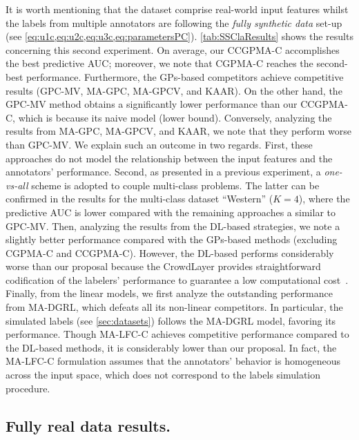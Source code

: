 \documentclass[journal]{IEEEtran}
\begin{document}
It is worth mentioning that the dataset comprise real-world input features whilst the labels from multiple annotators are following the \textit{fully synthetic data} set-up (see \cref{eq:u1c,eq:u2c,eq:u3c,eq:parametersPC}). \cref{tab:SSClaResults} shows the results concerning this second experiment. On average, our CCGPMA-C accomplishes the best predictive AUC; moreover, we note that CGPMA-C reaches the second-best performance. Furthermore, the GPs-based competitors achieve competitive results (GPC-MV, MA-GPC, MA-GPCV, and KAAR). On the other hand, the GPC-MV method obtains a significantly lower performance than our CCGPMA-C, which is because its naive model (lower bound). Conversely, analyzing the results from MA-GPC, MA-GPCV, and KAAR, we note that they perform worse than GPC-MV. We explain such an outcome in two regards. First, these approaches do not model the relationship between the input features and the annotators' performance. Second, as presented in a previous experiment, a \textit{one-vs-all} scheme is adopted to couple multi-class problems. The latter can be confirmed in the results for the multi-class dataset ``Western'' ($K=4$), where the predictive AUC is lower compared with the remaining approaches a similar to GPC-MV. Then, analyzing the results from the DL-based strategies, we note a slightly better performance compared with the GPs-based methods (excluding CGPMA-C and CCGPMA-C). However, the DL-based performs considerably worse than our proposal because the CrowdLayer provides straightforward codification of the labelers' performance to guarantee a low computational cost~\cite{morales2019scalable1}. Finally, from the linear models, we first analyze the outstanding performance from MA-DGRL, which defeats all its non-linear competitors. In particular, the simulated labels (see \cref{sec:datasets}) follows the MA-DGRL model, favoring its performance. Though MA-LFC-C achieves competitive performance compared to the DL-based methods, it is considerably lower than our proposal. In fact, the MA-LFC-C formulation assumes that the annotators' behavior is homogeneous across the input space, which does not correspond to the labels simulation procedure.   

\subsection{Fully real data results.}
\end{document}
